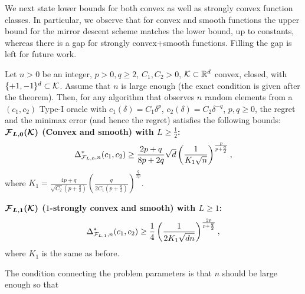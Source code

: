 We next state lower bounds for both convex as well as strongly convex function classes. In particular, we observe that for convex and smooth functions the upper bound for the mirror descent scheme matches the lower bound, up to constants, whereas there is a gap for strongly convex+smooth functions.
Filling the gap is left for future work.
\begin{theorem}
\label{thm:lb-convex}
Let $n>0$ be an integer, $p>0, q\ge 2$, $C_1,C_2>0$, 
$\mathcal{K}\subset \mathbb{R}^d$ convex, closed, with  $\{+1,-1\}^d\subset \mathcal{K}$.
Assume that $n$ is large enough (the exact condition is given after the theorem). 
Then, for any algorithm that observes $n$ random elements from a $(c_1,c_2)$ Type-I oracle 
 with $c_1(\delta) = C_1 \delta^p$, $c_2(\delta) = C_2 \delta^{-q}$, $p,q\ge 0$,
 the regret and the minimax error (and hence the regret) satisfies the following bounds:\\
\textbf{$\bm{\mathcal{F}_{L,0}(\mathcal{K})}$ (Convex and smooth) with $L\ge \frac12$:}
\[
 \Delta_{\mathcal{F}_{L,0},n}^{*}(c_1,c_2) \ge \dfrac{2p+q}{8p+2q}\sqrt{d}\left(\dfrac{1}{ K_1 \sqrt n}\right)^{\frac{p}{p+\frac{q}{2}}},
\]
where $K_1 =\frac{4p+q}{\sqrt{C_2}(p+\tfrac{q}{2})} \left(\frac{q}{2C_1(p+\tfrac{q}{2})}\right)^{\frac{q}{2p}}$.

\textbf{$\bm{\mathcal{F}_{L,1}(\mathcal{K})}$ ($1$-strongly convex and smooth) with $L\ge 1$:}
\[
\Delta_{\mathcal{F}_{L,1}, n}^{*}(c_1,c_2) \ge \dfrac{1}{4}  \left(\dfrac{1}{2 K_1 \sqrt {d n}}\right)^{\frac{2p}{p+\frac{q}{2}}}, 
\]
where $K_1$ is the same as before.
\end{theorem}
The condition connecting the problem parameters is that $n$ should be large enough so that\\

